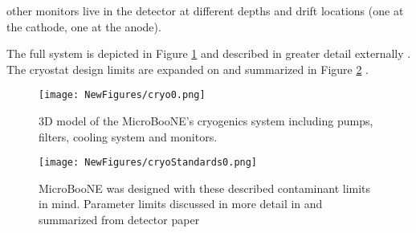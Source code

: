 \documentclass[12pt]{article}
\begin{document}
 other monitors live in the detector at different depths and drift locations (one at the cathode, one at the anode). 
\par The full system is depicted in Figure \ref{fig:cryo0} and described in greater detail externally \cite{bib:purity} \cite{bib:purity2}. The cryostat design limits are expanded on and summarized in Figure \ref{fig:cryo1} \cite{bib:uboone_JINST}.

\begin{figure}[h!]
\centering
\texttt{[image: NewFigures/cryo0.png]}
\caption{ 3D model of the MicroBooNE's cryogenics system including pumps, filters, cooling system and monitors.  } 
\label{fig:cryo0}
\end{figure}
  

\begin{figure}[h!]
\centering
\texttt{[image: NewFigures/cryoStandards0.png]}
\caption{ MicroBooNE was designed with these described contaminant limits in mind. Parameter limits discussed in more detail in and summarized from detector paper \cite{bib:uboone_JINST} }
\label{fig:cryo1}
\end{figure}

\end{document}

